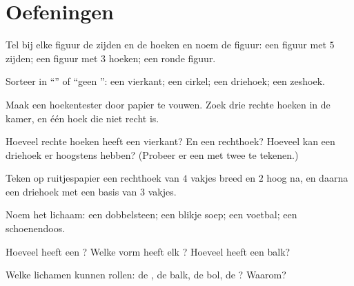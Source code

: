 \section{Oefeningen}

\begin{exercise}[$\star$]\label{exo:g2:shapes:1}
Tel bij elke figuur de zijden en de hoeken en noem de figuur: een figuur
met $5$ zijden; een figuur met $3$ hoeken; een ronde figuur.
\end{exercise}

\begin{exercise}[$\star$]\label{exo:g2:shapes:2}
Sorteer in ``'' of ``geen '': een vierkant; een cirkel;
een driehoek; een zeshoek.
\end{exercise}

\begin{exercise}[$\star$]\label{exo:g2:shapes:3}
Maak een hoekentester door papier te vouwen. Zoek drie rechte hoeken in
de kamer, en één hoek die niet recht is.
\end{exercise}

\begin{exercise}[$\star$]\label{exo:g2:shapes:4}
Hoeveel rechte hoeken heeft een vierkant? En een rechthoek? Hoeveel kan
een driehoek er hoogstens hebben? (Probeer er een met twee te tekenen.)
\end{exercise}

\begin{exercise}[$\star$]\label{exo:g2:shapes:5}
Teken op ruitjespapier een rechthoek van $4$ vakjes breed en $2$ hoog
na, en daarna een driehoek met een basis van $3$ vakjes.
\end{exercise}

\begin{exercise}[$\star$]\label{exo:g2:shapes:6}
Noem het lichaam: een dobbelsteen; een blikje soep; een voetbal; een
schoenendoos.
\end{exercise}

\begin{exercise}[$\star$]\label{exo:g2:shapes:7}
Hoeveel  heeft een ? Welke vorm heeft elk ?
Hoeveel  heeft een balk?
\end{exercise}

\begin{exercise}[$\star$]\label{exo:g2:shapes:8}
Welke lichamen kunnen rollen: de , de balk, de bol, de ?
Waarom?
\end{exercise}

